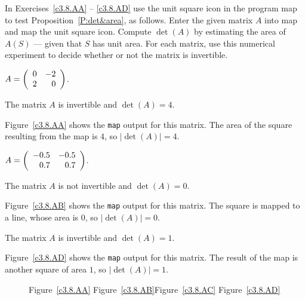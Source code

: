\documentclass{ximera}
\begin{document}
\noindent  In Exercises~\ref{c3.8.AA} -- \ref{c3.8.AD} use the {\sf unit 
square} icon in the program {\sf map} to test Proposition~\ref{P:det&area}, as 
follows. Enter the given matrix $A$ into {\sf map} and map the {\sf unit 
square} icon.  Compute $\det(A)$ by estimating the area of $A(S)$ --- given 
that $S$ has unit area.  For each matrix, use this numerical experiment to 
decide whether or not the matrix is invertible.
\begin{exercise}  \label{c3.8.AA}
$A=\left(\begin{array}{rr} 0 & -2\\ 2 &0\end{array}\right)$.

\begin{solution}
\ans The matrix $A$ is invertible and $\det(A) = 4$.

\soln Figure~\ref{c3.8.AA} shows the {\tt map} output for this matrix.
The area of the square resulting from the map is $4$, so $|\det(A)| = 4$.

\end{solution}
\end{exercise}
\begin{exercise}  \label{c3.8.AB}
$A=\left(\begin{array}{rr} -0.5 & -0.5\\ 0.7 &0.7\end{array}\right)$.

\begin{solution}
\ans The matrix $A$ is not invertible and $\det(A) = 0$.

\soln Figure~\ref{c3.8.AB} shows the {\tt map} output for this matrix.
The square is mapped to a line, whose area is $0$, so $|\det(A)| = 0$.

\ans The matrix $A$ is invertible and $\det(A) = 1$.

\soln Figure~\ref{c3.8.AD} shows the {\tt map} output for this matrix.
The result of the map is another square of area $1$, so $|\det(A)| = 1$.

\begin{figure}[htb]
                       \centerline{%
                       }
        \centerline{Figure~\ref{c3.8.AA}\hspace{0.8in}
        Figure~\ref{c3.8.AB}\hspace{0.8in}Figure~\ref{c3.8.AC}
        \hspace{0.8in}Figure~\ref{c3.8.AD}}
\end{figure}

\end{solution}
\end{exercise}
\end{document}
